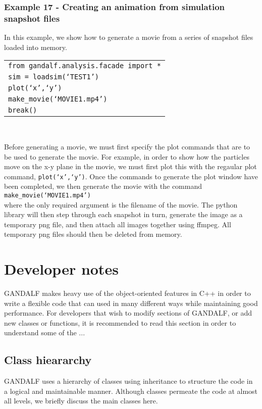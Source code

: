\documentclass[a4paper]{article}
\newcommand{\var}[1]{\texttt{#1}}
\newcommand{\singlecommand}[1]{\\ \newline \indent \var{#1} \\ \newline \noindent}
\begin{document}
\subsubsection{Example  17 - Creating an animation from simulation snapshot files}
In this example, we show how to generate a movie from a series of snapshot files loaded into memory. \\


\begin{tabular}{p{14.0cm}}
\var{from gandalf.analysis.facade import *} \\
\var{sim = loadsim(`TEST1')} \\
\var{plot(`x',`y')} \\
\var{make\_movie(`MOVIE1.mp4')} \\
\var{break()} \\
\end{tabular} \\
\newline

\noindent Before generating a movie, we must first specify the plot commands that are to be used to generate the movie.  For example, in order to show how the particles move on the x-y plane in the movie, we must first plot this with the regaular plot command, \var{plot(`x',`y')}.  Once the commands to generate the plot window have been completed, we then generate the movie with the command \singlecommand{make\_movie(`MOVIE1.mp4')} where the only required argument is the filename of the movie.  The python library will then step through each snapshot in turn, generate the image as a temporary png file, and then attach all images together using ffmpeg.  All temporary png files should then be deleted from memory.


\newpage


\section{Developer notes}
GANDALF makes heavy use of the object-oriented features in C++ in order to write a flexible code that can used in many different ways while maintaining good performance.  For developers that wish to modify sections of GANDALF, or add new classes or functions, it is recommended to read this section in order to understand some of the ...


\subsection{Class hieararchy}
GANDALF uses a hierarchy of classes using inheritance to structure the code in a logical and maintainable manner.  Although classes permeate the code at almost all levels, we briefly discuss the main classes here.
\end{document}
